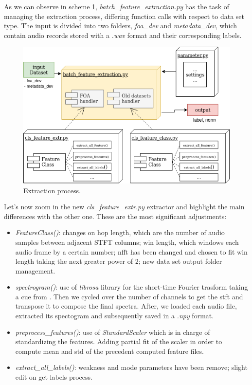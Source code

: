 \documentclass[11pt]{article}
\begin{document}
\noindent
As we can observe in scheme \ref{fig:extraction}, \textit{batch\_feature\_extraction.py} has the task of managing the extraction process, differing function calls with respect to data set type. The input is divided into two folders, \textit{foa\_dev} and \textit{metadata\_dev}, which contain audio records stored with a \textit{.wav} format and their corresponding labels.

\begin{figure}[h!]
	\centering
	\includegraphics[width=12.5cm]{img/extraction.png}
	\caption{Extraction process.}
	\label{fig:extraction}
\end{figure}

\noindent
Let's now zoom in the new \textit{cls\_feature\_extr.py} extractor and highlight the main differences with the other one. These are the most significant adjustments:

\begin{itemize}
	\item \textit{FeatureClass()}: changes on hop length, which are the number of audio samples between adjacent STFT columns; win length, which windows each audio frame by a certain number; nfft has been changed and chosen to fit win length taking the next greater power of 2; new data set output folder management.
	\item \textit{spectrogram()}: use of \textit{librosa} library for the short-time Fourier trasform taking a cue from \cite{git}. Then we cycled over the number of channels to get the stft and transpose it to compose the final spectra. After, we loaded each audio file, extracted its spectogram and subsequently saved in a \textit{.npy} format.
	\item \textit{preprocess\_features()}: use of \textit{StandardScaler} which is in charge of standardizing the features. Adding partial fit of the scaler in order to compute mean and std of the precedent computed feature files.
	\item \textit{extract\_all\_labels()}: weakness and mode parameters have been remove; slight edit on get labels process.
\end{itemize}
\end{document}
